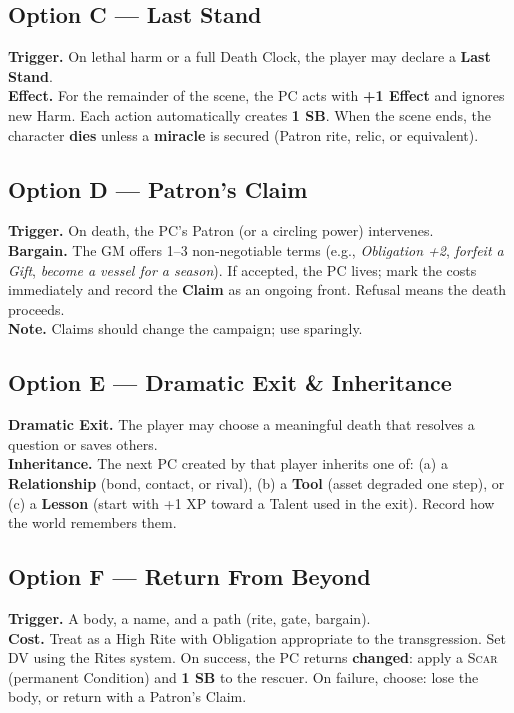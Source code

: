 \subsection*{Option C — Last Stand}
\textbf{Trigger.} On lethal harm or a full Death Clock, the player may declare a \textbf{Last Stand}.\\
\textbf{Effect.} For the remainder of the scene, the PC acts with \textbf{+1 Effect} and ignores new Harm. Each action automatically creates \textbf{1 SB}. When the scene ends, the character \textbf{dies} unless a \textbf{miracle} is secured (Patron rite, relic, or equivalent).

\subsection*{Option D — Patron's Claim}
\textbf{Trigger.} On death, the PC's Patron (or a circling power) intervenes.\\
\textbf{Bargain.} The GM offers 1–3 non‑negotiable terms (e.g., \emph{Obligation +2}, \emph{forfeit a Gift}, \emph{become a vessel for a season}). If accepted, the PC lives; mark the costs immediately and record the \textbf{Claim} as an ongoing front. Refusal means the death proceeds.\\
\textbf{Note.} Claims should change the campaign; use sparingly.

\subsection*{Option E — Dramatic Exit \& Inheritance}
\textbf{Dramatic Exit.} The player may choose a meaningful death that resolves a question or saves others.\\
\textbf{Inheritance.} The next PC created by that player inherits one of: (a) a \textbf{Relationship} (bond, contact, or rival), (b) a \textbf{Tool} (asset degraded one step), or (c) a \textbf{Lesson} (start with +1 XP toward a Talent used in the exit). Record how the world remembers them.

\subsection*{Option F — Return From Beyond}
\textbf{Trigger.} A body, a name, and a path (rite, gate, bargain).\\
\textbf{Cost.} Treat as a High Rite with Obligation appropriate to the transgression. Set DV using the Rites system. On success, the PC returns \textbf{changed}: apply a \textsc{Scar} (permanent Condition) and \textbf{1 SB} to the rescuer. On failure, choose: lose the body, or return with a Patron's Claim.

